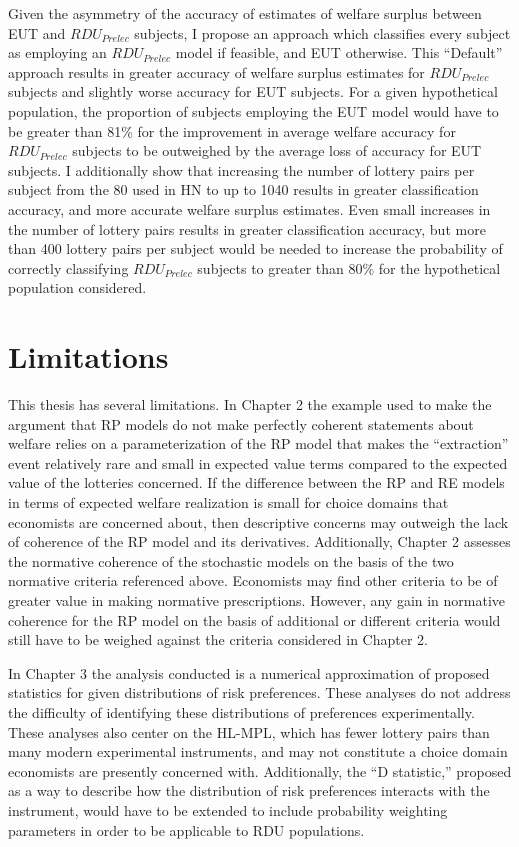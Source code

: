 \documentclass[../main.tex]{subfiles}
\begin{document}
Given the asymmetry of the accuracy of estimates of welfare surplus between EUT and $\mathit{RDU_{Prelec}}$ subjects, I propose an approach which classifies every subject as employing an $\mathit{RDU_{Prelec}}$ model if feasible, and EUT otherwise.
This \enquote{Default} approach results in greater accuracy of welfare surplus estimates for $\mathit{RDU_{Prelec}}$ subjects and slightly worse accuracy for EUT subjects.
For a given hypothetical population, the proportion of subjects employing the EUT model would have to be greater than 81\% for the improvement in average welfare accuracy for $\mathit{RDU_{Prelec}}$ subjects to be outweighed by the average loss of accuracy for EUT subjects.
I additionally show that increasing the number of lottery pairs per subject from the 80 used in HN to up to 1040 results in greater classification accuracy, and more accurate welfare surplus estimates.
Even small increases in the number of lottery pairs results in greater classification accuracy, but more than 400 lottery pairs per subject would be needed to increase the probability of correctly classifying $\mathit{RDU_{Prelec}}$ subjects to greater than 80\% for the hypothetical population considered.

\section{Limitations}
This thesis has several limitations.
In Chapter 2 the example used to make the argument that RP models do not make perfectly coherent statements about welfare relies on a parameterization of the RP model that makes the \enquote{extraction} event relatively rare and small in expected value terms compared to the expected value of the lotteries concerned.
If the difference between the RP and RE models in terms of expected welfare realization is small for choice domains that economists are concerned about, then descriptive concerns may outweigh the lack of coherence of the RP model and its derivatives.
Additionally, Chapter 2 assesses the normative coherence of the stochastic models on the basis of the two normative criteria referenced above.
Economists may find other criteria to be of greater value in making normative prescriptions.
However, any gain in normative coherence for the RP model on the basis of additional or different criteria would still have to be weighed against the criteria considered in Chapter 2.

In Chapter 3 the analysis conducted is a numerical approximation of proposed statistics for given distributions of risk preferences.
These analyses do not address the difficulty of identifying these distributions of preferences experimentally.
These analyses also center on the HL-MPL, which has fewer lottery pairs than many modern experimental instruments, and may not constitute a choice domain economists are presently concerned with.
Additionally, the \enquote{D statistic,} proposed as a way to describe how the distribution of risk preferences interacts with the instrument, would have to be extended to include probability weighting parameters in order to be applicable to RDU populations.
\end{document}
